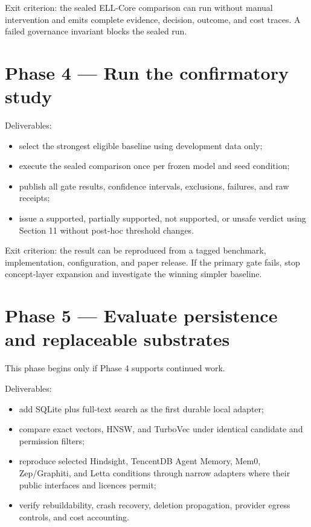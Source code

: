 \documentclass[
  english,
  a4paper,
  DIV=11,
  numbers=noendperiod]{scrreprt}
\providecommand{\tightlist}{%
  \setlength{\itemsep}{0pt}\setlength{\parskip}{0pt}}
\begin{document}
Exit criterion: the sealed ELL-Core comparison can run without manual
intervention and emits complete evidence, decision, outcome, and cost
traces. A failed governance invariant blocks the sealed run.

\section{Phase 4 --- Run the confirmatory
study}\label{phase-4-run-the-confirmatory-study}

Deliverables:

\begin{itemize}
\tightlist
\item
  select the strongest eligible baseline using development data only;
\item
  execute the sealed comparison once per frozen model and seed
  condition;
\item
  publish all gate results, confidence intervals, exclusions, failures,
  and raw receipts;
\item
  issue a supported, partially supported, not supported, or unsafe
  verdict using Section 11 without post-hoc threshold changes.
\end{itemize}

Exit criterion: the result can be reproduced from a tagged benchmark,
implementation, configuration, and paper release. If the primary gate
fails, stop concept-layer expansion and investigate the winning simpler
baseline.

\section{Phase 5 --- Evaluate persistence and replaceable
substrates}\label{phase-5-evaluate-persistence-and-replaceable-substrates}

This phase begins only if Phase 4 supports continued work.

Deliverables:

\begin{itemize}
\tightlist
\item
  add SQLite plus full-text search as the first durable local adapter;
\item
  compare exact vectors, HNSW, and TurboVec under identical candidate
  and permission filters;
\item
  reproduce selected Hindsight, TencentDB Agent Memory, Mem0,
  Zep/Graphiti, and Letta conditions through narrow adapters where their
  public interfaces and licences permit;
\item
  verify rebuildability, crash recovery, deletion propagation, provider
  egress controls, and cost accounting.
\end{itemize}
\end{document}
